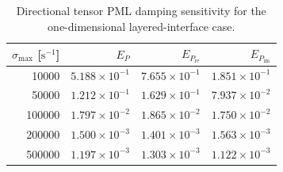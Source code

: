 \begin{table}[htbp]
    \centering
    \caption{Directional tensor PML damping sensitivity for the one-dimensional layered-interface case.}
    \label{tab:pmlSigmaSensitivity}
    \begin{tabular}{rrrr}
        \toprule
        $\sigma_{\max}$ [$\mathrm{s}^{-1}$] & $E_P$ & $E_{P_{\mathrm{re}}}$ & $E_{P_{\mathrm{im}}}$ \\
        \midrule
        10000 & $5.188\times10^{-1}$ & $7.655\times10^{-1}$ & $1.851\times10^{-1}$ \\
        50000 & $1.212\times10^{-1}$ & $1.629\times10^{-1}$ & $7.937\times10^{-2}$ \\
        100000 & $1.797\times10^{-2}$ & $1.865\times10^{-2}$ & $1.750\times10^{-2}$ \\
        200000 & $1.500\times10^{-3}$ & $1.401\times10^{-3}$ & $1.563\times10^{-3}$ \\
        500000 & $1.197\times10^{-3}$ & $1.303\times10^{-3}$ & $1.122\times10^{-3}$ \\
        \bottomrule
    \end{tabular}
\end{table}
